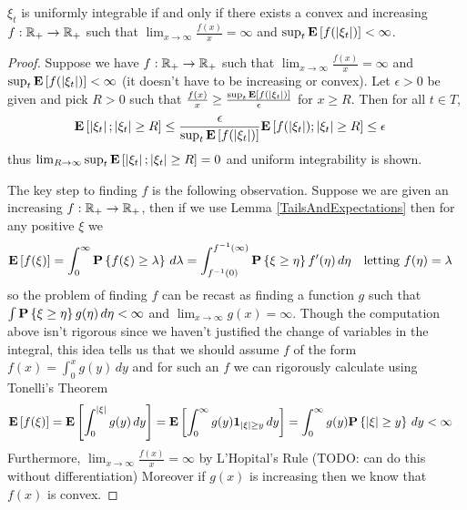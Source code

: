 \begin{lem}\label{deLaValleePoussin}$\xi_t$ is uniformly integrable if and only if there exists
  a convex and increasing $f : \mathbb{R}_+ \to \mathbb{R}_+$ such that
  $\lim_{x \to \infty} \frac{f(x)}{x} = \infty$ and $\sup_t
  \textbf{E}\left[f(\left \vert \xi_t \right \vert)\right] < \infty$.
\end{lem}
\begin{proof}
Suppose we have $f : \mathbb{R}_+ \to \mathbb{R}_+$ such that $\lim_{x \to
  \infty} \frac{f(x)}{x} = \infty$ and
$\sup_t  \textbf{E}\left[f(\left \vert \xi_t \right \vert)\right] < \infty$ (it doesn't have to be
increasing or convex).  Let $\epsilon > 0$ be given and pick $R > 0$
such that $\frac{f(x)}{x} \geq \frac{\sup_t \textbf{E}\left[f(\left \vert \xi_t \right \vert)\right]}{\epsilon }$
for $x \geq R$.  Then for all $t \in T$,
\begin{align*}
\textbf{E}\left[\left \vert \xi_t \right \vert; \left \vert \xi_t \right \vert \geq R\right] &\leq
\frac{\epsilon}{\sup_t \textbf{E}\left[f(\left \vert \xi_t \right \vert)\right]}
\textbf{E}\left[f(\left \vert \xi_t \right \vert); \left \vert \xi_t \right \vert \geq R\right] 
\leq \epsilon
\end{align*}
thus $\lim_{R \to \infty} \sup_t  \textbf{E}\left[\left \vert \xi_t \right \vert;
  \left \vert \xi_t \right \vert \geq R\right] = 0$ and uniform integrability is shown.

The key step to finding $f$ is the following observation.  Suppose we
are given an increasing $f : \mathbb{R}_+ \to \mathbb{R}_+$, then if we use
Lemma \ref{TailsAndExpectations} then for any positive $\xi$ we 
\begin{align*}
\textbf{E}\left[f(\xi)\right] &= \int_0^\infty \textbf{P}\left \{f(\xi) \geq \lambda \right \} \, d\lambda =
\int_{f^{-1}(0)}^{f^{-1}(\infty)} \textbf{P}\left \{\xi \geq \eta \right \} f^\prime(\eta) \, d\eta & &
\text{letting $f(\eta) = \lambda$}
\end{align*}
so the problem of finding $f$ can be recast as finding a function $g$
such that $\int \textbf{P}\left \{\xi \geq \eta \right \} g(\eta) \, d\eta < \infty$
and $\lim_{x \to \infty} g(x) = \infty$.  Though the computation above
isn't rigorous since we haven't justified the change of variables in
the integral, this idea tells us that we
should assume $f$ of the form $f(x) = \int_0^x g(y) \, dy$ and for
such an $f$ we can rigorously calculate using Tonelli's Theorem
\begin{align*}
\textbf{E}\left[f(\xi)\right] &= \textbf{E}\left[\int_0^{\left \vert \xi \right \vert} g(y) \, dy\right] =
\textbf{E}\left[\int_0^\infty g(y) \textbf{1}_{\left \vert \xi \right \vert \geq y} \,
  dy\right] = \int_0^\infty g(y) \textbf{P}\left \{\left \vert \xi \right \vert \geq y \right \}\,
  dy < \infty
\end{align*}
Furthermore, 
$\lim_{x \to \infty} \frac{f(x)}{x} = \infty$ by L'Hopital's Rule
(TODO: can do this without differentiation)
Moreover if $g(x)$ is increasing then we know that $f(x)$ is convex.


\end{proof}
